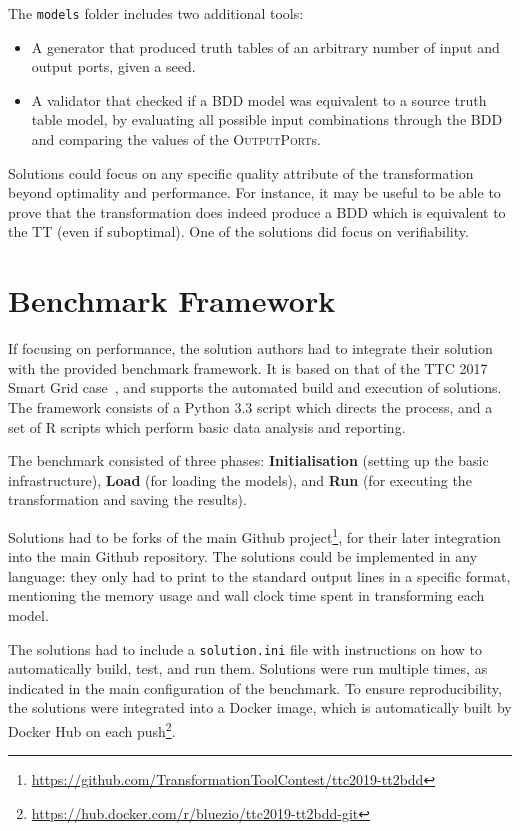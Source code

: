 \documentclass[a4paper]{article}
\newcommand*{\class}[1]{\textsc{#1}}
\newcommand*{\file}[1]{\texttt{#1}}
\begin{document}
The \file{models} folder includes two additional tools:
\begin{itemize}
\item A generator that produced truth tables of an arbitrary number of input and
  output ports, given a seed.

\item A validator that checked if a BDD model was equivalent to a source truth
  table model, by evaluating all possible input combinations through the BDD and
  comparing the values of the \class{Output\-Port}s.
\end{itemize}

Solutions could focus on any specific quality attribute of the transformation
beyond optimality and performance. For instance, it may be useful to be able to
prove that the transformation does indeed produce a BDD which is equivalent to
the TT (even if suboptimal). One of the solutions did focus on verifiability.

\section{Benchmark Framework}
\label{sec:benchmark-framework}

If focusing on performance, the solution authors had to integrate their solution
with the provided benchmark framework. It is based on that of the TTC 2017 Smart
Grid case~\cite{hinkel_ttc_2017}, and supports the automated build and execution
of solutions. The framework consists of a Python 3.3 script which directs the
process, and a set of R scripts which perform basic data analysis and reporting.

The benchmark consisted of three phases: \textbf{Initialisation} (setting up the
basic infrastructure), \textbf{Load} (for loading the models), and \textbf{Run}
(for executing the transformation and saving the results).

Solutions had to be forks of the main Github
project\footnote{\url{https://github.com/TransformationToolContest/ttc2019-tt2bdd}},
for their later integration into the main Github repository. The solutions could
be implemented in any language: they only had to print to the standard output
lines in a specific format, mentioning the memory usage and wall clock time
spent in transforming each model.

The solutions had to include a \file{solution.ini} file with instructions on how
to automatically build, test, and run them. Solutions were run multiple times,
as indicated in the main configuration of the benchmark. To ensure
reproducibility, the solutions were integrated into a Docker image, which is
automatically built by Docker Hub on each
push\footnote{\url{https://hub.docker.com/r/bluezio/ttc2019-tt2bdd-git}}.
\end{document}
